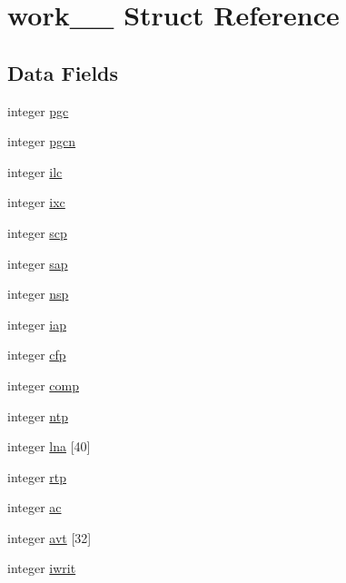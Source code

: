 \hypertarget{structwork__1__}{}\section{work\+\_\+\_\+ Struct Reference}
\label{structwork__1__}
\subsection*{Data Fields}
\begin{DoxyCompactItemize}
\item 
integer \hyperlink{structwork__1___af982e7b03199b7670e434495c5090a6d}{pgc}
\item 
integer \hyperlink{structwork__1___abd5ef67d66146361f4ebd85377cc544f}{pgcn}
\item 
integer \hyperlink{structwork__1___aed36903b9bf6f1639a1175f64963f24a}{ilc}
\item 
integer \hyperlink{structwork__1___a83bf1c7389b03f7c671baff0321065ef}{ixc}
\item 
integer \hyperlink{structwork__1___aba97b44bdb374730ebef3132abeddfbd}{scp}
\item 
integer \hyperlink{structwork__1___a26b15e673285fe63908c6b07c16f75b0}{sap}
\item 
integer \hyperlink{structwork__1___aa7fbe70dacdeb989a9646e25d4b69e4b}{nsp}
\item 
integer \hyperlink{structwork__1___acf59d0d75ef883ea71e3f4d50c70ca95}{iap}
\item 
integer \hyperlink{structwork__1___aee0112d5275cf9e11cf7db52f700fe66}{cfp}
\item 
integer \hyperlink{structwork__1___a490e95c3cd0bdf121a02be31f54d6ce0}{comp}
\item 
integer \hyperlink{structwork__1___aeff7c5574250e2f3da1e85969ce6fa8b}{ntp}
\item 
integer \hyperlink{structwork__1___aab7bfeb9281ccba8ec34102134685634}{lna} \mbox{[}40\mbox{]}
\item 
integer \hyperlink{structwork__1___af3ee2620c7348918a217cdebfeec014c}{rtp}
\item 
integer \hyperlink{structwork__1___ae0e1043cc8776bd432dabc60671dcb24}{ac}
\item 
integer \hyperlink{structwork__1___af663adb0702a1e1edb4ee62317c13ecf}{avt} \mbox{[}32\mbox{]}
\item 
integer \hyperlink{structwork__1___ae3baf791cc5851ae41a89032931c0a83}{iwrit}
\end{DoxyCompactItemize}


